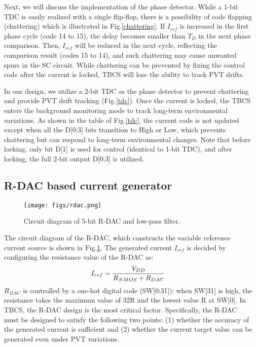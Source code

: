\documentclass[paper]{ieice}
\begin{document}
\qquad Next, we will discuss the implementation of the phase detector. While a 1-bit TDC is easily realized with a single flip-flop, there is a possibility of code flapping (chattering) which is illustrated in Fig.\ref{chattering}. If $I_{ref}$ is increased in the first phase cycle (code 14 to 15), the delay becomes smaller than $T_D$ in the next phase comparison. Then, $I_{ref}$ will be reduced in the next cycle, reflecting the comparison result (codes 15 to 14), and such chattering may cause unwanted spurs in the SC circuit. While chattering can be prevented by fixing the control code after the current is locked, TBCS will lose the ability to track PVT drifts.

In our design, we utilize a 2-bit TDC as the phase detector to prevent chattering and provide PVT drift tracking (Fig.\ref{tdc}).
Once the current is locked, the TBCS enters the background monitoring mode to track long-term environmental variations.  As shown in the table of Fig.\ref{tdc}, the current code is not updated except when all the D[0:3] bits transition to High or Low, which prevents chattering but can respond to long-term environmental changes. Note that before locking, only bit D[1] is used for control (identical to 1-bit TDC), and after locking, the full 2-bit output D[0:3] is utilized.

\subsection{R-DAC based current generator}
\begin{figure}[!t]
\centering
 \texttt{[image: figs/rdac.png]}
  \caption{Circuit diagram of 5-bit R-DAC and low-pass filter.}
\label{rdac_sche}
\end{figure}

\qquad The circuit diagram of the R-DAC, which constructs the variable reference current source is shown in Fig.\ref{rdac_sche}. The generated current $I_{ref}$ is decided by configuring the resistance value of the R-DAC as:
\begin{eqnarray}
    \centering
     I_{ref} = \frac{V_{DD}}{R_{NMOS}+R_{DAC}}
    \label{iref_eq}
\end{eqnarray}
$R_{DAC}$ is controlled by a one-hot digital code (SW[0:31]): when SW[31] is high, the resistance takes the maximum value of 32R and the lowest value R at SW[0]. In TBCS, the R-DAC design is the most critical factor. Specifically, the R-DAC must be designed to satisfy the following two points: (1) whether the accuracy of the generated current is sufficient and (2) whether the current target value can be generated even under PVT variations.
\end{document}
